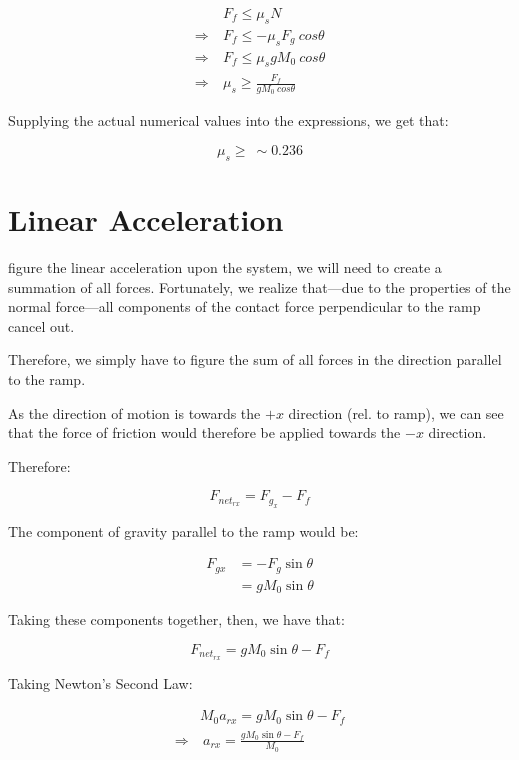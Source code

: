 \documentclass[letterpaper]{article}
\begin{document}
\begin{align}
   &F_f \leq \mu_s N \\
\Rightarrow\ & F_f \leq -\mu_s F_g\ cos\theta \\
\Rightarrow\ & F_f \leq \mu_s gM_0\ cos\theta \\
\Rightarrow\ & \mu_s \geq \frac{F_f}{gM_0\ cos\theta} 
\end{align}

Supplying the actual numerical values into the expressions, we get that:

\begin{equation}
   \mu_s \geq\ \sim 0.236 
\end{equation}

\section{Linear Acceleration}
\label{sec:org94c8f80}
\To figure the linear acceleration upon the system, we will need to create a summation of all forces. Fortunately, we realize that---due to the properties of the normal force---all components of the contact force perpendicular to the ramp cancel out.

Therefore, we simply have to figure the sum of all forces in the direction parallel to the ramp.

As the direction of motion is towards the \(+x\) direction (rel. to ramp), we can see that the force of friction would therefore be applied towards the \(-x\) direction.

Therefore:

\begin{equation}
   F_{net_{rx}} = F_g_x - F_f 
\end{equation}

The component of gravity parallel to the ramp would be:

\begin{align}
   F_{gx} &= -F_g \sin\theta \\
&=gM_0 \sin\theta 
\end{align}

Taking these components together, then, we have that:

\begin{equation}
   F_{net_{rx}} = gM_0 \sin\theta - F_f 
\end{equation}

Taking Newton's Second Law:

\begin{align}
   &M_0 a_{rx} = gM_0 \sin\theta - F_f \\
\Rightarrow&\ a_{rx} = \frac{gM_0 \sin\theta - F_f}{M_0}
\end{align}
\end{document}
